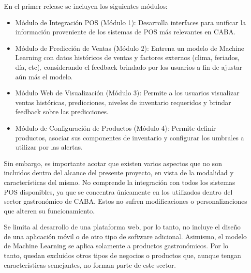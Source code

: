 En el primer release se incluyen los siguientes módulos: 

\begin{itemize}
    \item Módulo de Integración POS (Módulo 1): Desarrolla interfaces para unificar la información proveniente de los sistemas de POS más relevantes en CABA. 
    \item Módulo de Predicción de Ventas (Módulo 2): Entrena un modelo de Machine Learning con datos históricos de ventas y factores externos (clima, feriados, día, etc), considerando el feedback brindado por los usuarios a fin de ajustar aún más el modelo. 
    \item Módulo Web de Visualización (Módulo 3): Permite a los usuarios visualizar ventas históricas, predicciones, niveles de inventario requeridos y brindar feedback sobre las predicciones. 
    \item Módulo de Configuración de Productos (Módulo 4): Permite definir productos, asociar sus componentes de inventario y configurar los umbrales a utilizar por las alertas.
\end{itemize}

Sin embargo, es importante acotar que existen varios aspectos que no son incluidos dentro del alcance del presente proyecto, en vista de la modalidad y características del mismo. No comprende la integración con todos los sistemas POS disponibles, ya que se concentra únicamente en los utilizados dentro del sector gastronómico de CABA. Estos no sufren modificaciones o personalizaciones que alteren su funcionamiento.

Se limita al desarrollo de una plataforma web, por lo tanto, no incluye el diseño de una aplicación móvil o de otro tipo de software adicional. Asimismo, el modelo de Machine Learning se aplica solamente a productos gastronómicos. Por lo tanto, quedan excluidos otros tipos de negocios o productos que, aunque tengan características semejantes, no forman parte de este sector.
